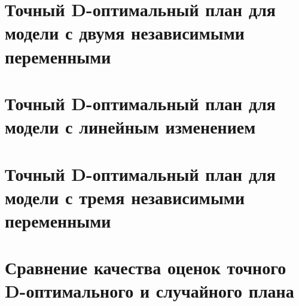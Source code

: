 \section{Точный D-оптимальный план для модели с двумя независимыми переменными}
\label{chapter2/diploma-section-2-1}


\section{Точный D-оптимальный план для модели с линейным изменением}
\label{chapter2/diploma-section-2-2}


\section{Точный D-оптимальный план для модели с тремя независимыми переменными}
\label{chapter2/diploma-section-2-3}


\section{Сравнение качества оценок точного D-оптимального и случайного плана}
\label{chapter2/diploma-section-2-4}

